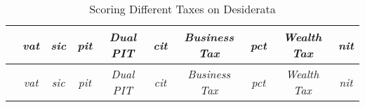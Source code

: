 


\begin{landscape}
\begin{longtabu}{p{4cm}ccccccccc}
\caption[Scoring Different Taxes on Desiderata]{Scoring Different Taxes on Desiderata\label{tab:tax-scores}}\\
\toprule
&\emph{vat}	&\emph{sic}	&\emph{pit}		&\emph{Dual PIT}	&\emph{cit}	&\emph{Business Tax}	&\emph{pct}	&\emph{Wealth Tax} 	&\emph{nit}\vspace{15pt} \\
\midrule
\endfirsthead

\toprule
 &\emph{vat}	&\emph{sic}	&\emph{pit}		&\emph{Dual PIT}	&\emph{cit}	&\emph{Business Tax}	&\emph{pct}	&\emph{Wealth Tax} 	&\emph{nit}\vspace{15pt} \\ \midrule \endhead




\end{longtabu}
\end{landscape}
